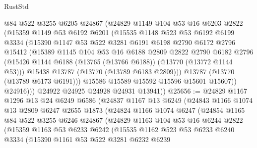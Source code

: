 \begin{lexlean}{RustStd}
\begin{coremodule}
            @84
            @522
            @3255
            @6205
            @24867
            (@24829
              @1149
              @104
              @53
              @16
              @6203
              @2822
              (@15359
                @1149
                @53
                @6192
                @6201
                (@15535
                  @1148
                  @523
                  @53
                  @6192
                  @6199
                  @3334
                  (@15390
                    @1147
                    @53
                    @522
                    @3281
                    @6191
                    @6198
                    @2790
                    @6172
                    @2796
                    @15412
                    (@15389
                      @1145
                      @104
                      @53
                      @16
                      @6188
                      @2809
                      @2822
                      @2790
                      @6182
                      @2796
                      (@15426 @1144 @6188 (@13765 (@13766 @6188)) (@13770 (@13772 @1144 @53)))
                      @15438
                      @13787
                      (@13770 (@13789 @6183 @2809)))
                    @13787
                    (@13770 (@13789 @6173 @6191)))
                  @15586
                  @15589
                  @15592
                  @15596
                  @15601
                  @15607))
              @24916)))
        @24922
        @24925
        @24928
        @24931
        @13941))
@25656 := @24829
    @1167
    @1296
    @13
    @24
    @6249
    @6586
    (@24837
      @1167
      @13
      @6249
      (@24843
        @1166
        @1074
        @13
        @2809
        @6247
        @2655
        @1873
        (@24824
          @1166
          @1074
          @6247
          (@24854
            @1165
            @84
            @522
            @3255
            @6246
            @24867
            (@24829
              @1163
              @104
              @53
              @16
              @6244
              @2822
              (@15359
                @1163
                @53
                @6233
                @6242
                (@15535
                  @1162
                  @523
                  @53
                  @6233
                  @6240
                  @3334
                  (@15390
                    @1161
                    @53
                    @522
                    @3281
                    @6232
                    @6239

\end{coremodule}
\end{lexlean}
